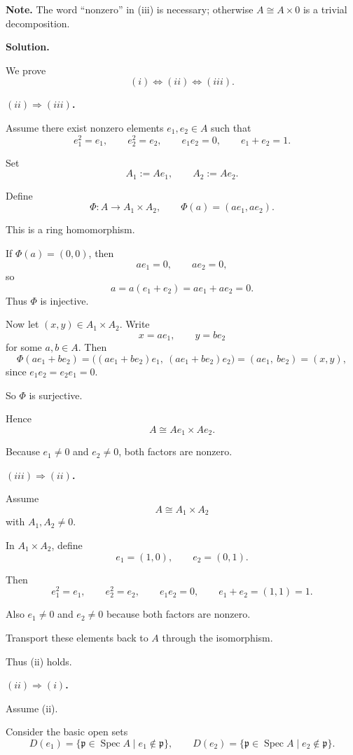\documentclass[12pt,a4paper]{article}
\DeclareMathOperator{\Spec}{Spec}
\theoremstyle{plain}
\theoremstyle{definition}      %
\begin{document}
	\medskip
	\textbf{Note.}
	The word ``nonzero'' in (iii) is necessary; otherwise \(A\cong A\times 0\) is a trivial decomposition.
	
	\bigskip
	\textbf{Solution.}
	
	We prove
	\[
	(i)\Longleftrightarrow(ii)\Longleftrightarrow(iii).
	\]
	
	\medskip
	\textbf{\((ii)\Longrightarrow(iii)\).}
	
	Assume there exist nonzero elements \(e_1,e_2\in A\) such that
	\[
	e_1^2=e_1,
	\qquad
	e_2^2=e_2,
	\qquad
	e_1e_2=0,
	\qquad
	e_1+e_2=1.
	\]
	
	Set
	\[
	A_1:=Ae_1,
	\qquad
	A_2:=Ae_2.
	\]
	
	Define
	\[
	\Phi:A\longrightarrow A_1\times A_2,
	\qquad
	\Phi(a)=(ae_1,ae_2).
	\]
	
	This is a ring homomorphism.
	
	If \(\Phi(a)=(0,0)\), then
	\[
	ae_1=0,
	\qquad
	ae_2=0,
	\]
	so
	\[
	a=a(e_1+e_2)=ae_1+ae_2=0.
	\]
	Thus \(\Phi\) is injective.
	
	Now let \((x,y)\in A_1\times A_2\).
	Write
	\[
	x=ae_1,
	\qquad
	y=be_2
	\]
	for some \(a,b\in A\).
	Then
	\[
	\Phi(ae_1+be_2)
	=
	\bigl((ae_1+be_2)e_1,\ (ae_1+be_2)e_2\bigr)
	=
	(ae_1,\ be_2)
	=
	(x,y),
	\]
	since \(e_1e_2=e_2e_1=0\).
	
	So \(\Phi\) is surjective.
	
	Hence
	\[
	A\cong Ae_1\times Ae_2.
	\]
	
	Because \(e_1\neq 0\) and \(e_2\neq 0\), both factors are nonzero.
	
	\bigskip
	\textbf{\((iii)\Longrightarrow(ii)\).}
	
	Assume
	\[
	A\cong A_1\times A_2
	\]
	with \(A_1,A_2\neq 0\).
	
	In \(A_1\times A_2\), define
	\[
	e_1=(1,0),
	\qquad
	e_2=(0,1).
	\]
	
	Then
	\[
	e_1^2=e_1,
	\qquad
	e_2^2=e_2,
	\qquad
	e_1e_2=0,
	\qquad
	e_1+e_2=(1,1)=1.
	\]
	
	Also \(e_1\neq 0\) and \(e_2\neq 0\) because both factors are nonzero.
	
	Transport these elements back to \(A\) through the isomorphism.
	
	Thus (ii) holds.
	
	\bigskip
	\textbf{\((ii)\Longrightarrow(i)\).}
	
	Assume (ii).
	
	Consider the basic open sets
	\[
	D(e_1)=\{\mathfrak p\in \Spec A \mid e_1\notin \mathfrak p\},
	\qquad
	D(e_2)=\{\mathfrak p\in \Spec A \mid e_2\notin \mathfrak p\}.
	\]
	
\end{document}

